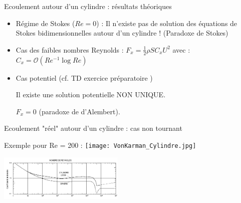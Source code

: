 \begin{frame}{Ecoulement autour d'un cylindre : résultats théoriques}


\begin{itemize}
\item Régime de Stokes ($Re = 0$) :
Il n'existe pas de solution des équations de Stokes bidimensionnelles autour d'un cylindre !
(Paradoxe de Stokes)

\item Cas des faibles nombres Reynolds :
$F_x = \frac{1}{2} \rho S C_x U^2 $
avec :
$ 
C_x = \mathcal{O} \left(Re^{-1} \log Re \right)
$

\medskip 
\pause 
\item Cas potentiel  (cf. TD exercice préparatoire ) 

Il existe une solution potentielle NON UNIQUE.

 $F_x = 0$ (paradoxe de d'Alembert).

 
\end{itemize}


\end{frame}



%



\begin{frame}{Ecoulement "réel" autour d'un cylindre : cas non tournant}  \hypertarget{frame:toto}{}

\small

Exemple pour Re = 200 :
\texttt{[image: VonKarman\_Cylindre.jpg]}


\includegraphics[width=60mm]{Cx_Cylindre_Sphere.pdf}


\end{frame}






